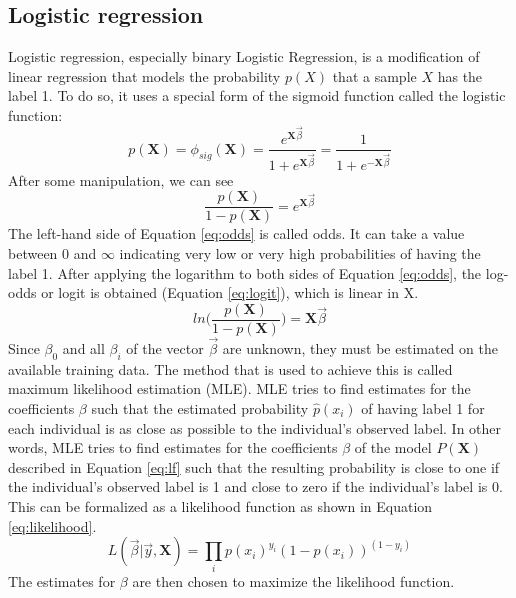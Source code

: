 \subsection{Logistic regression}
Logistic regression, especially binary Logistic Regression, is a modification 
of linear regression that models the probability $p(X)$ that a sample $X$ has 
the label 1. To do so, it uses a special form of the sigmoid function called 
the logistic function:
\begin{equation}
 p(\mathbf{X}) = \phi_{sig}(\mathbf{X}) = 
\frac{e^{\mathbf{X}\vec{\beta}}}{1+e^{\mathbf{X}\vec{\beta}}} = 
\frac{1}{1+e^{-\mathbf{X}\vec{\beta}}}
 \label{eq:lf}
\end{equation}
After some manipulation, we can see
\begin{equation}
 \frac{p(\mathbf{X})}{1-p(\mathbf{X})} = e^{\mathbf{X}\vec{\beta}}
 \label{eq:odds}
\end{equation}
The left-hand side of Equation \ref{eq:odds} is called odds. It can take a 
value between 0 and $\infty$ indicating very low or very high probabilities 
of having the label 1.
After applying the logarithm to both sides of Equation \ref{eq:odds}, the 
log-odds or logit is obtained (Equation \ref{eq:logit}), which is linear in X.
\begin{equation}
 ln \Big( \frac{p(\mathbf{X})}{1-p(\mathbf{X})} \Big) = \mathbf{X}\vec{\beta}
 \label{eq:logit}
\end{equation}
Since $\beta_0$ and all $\beta_i$ of the vector $\vec{\beta}$ are unknown, 
they must be estimated on the 
available training data. The method that is used to achieve this is called 
maximum likelihood estimation (MLE). MLE tries to find estimates for the 
coefficients $\beta$ such that the estimated probability $\hat{p}(x_i)$ of 
having label 1 for each individual is as close as possible to the individual's 
observed label. In other words, MLE tries to find estimates for the 
coefficients $\beta$ of the model $P(\mathbf{X})$ described in Equation 
\ref{eq:lf} such that the resulting probability is close to one if the 
individual's observed label is 1 and close to zero if the individual's label is 
0. This can be formalized as a likelihood function as shown in Equation 
\ref{eq:likelihood}.
\begin{equation}
 L(\vec{\beta}|\vec{y}, \mathbf{X}) = \prod_{i} p(x_i)^{y_i} 
(1-p(x_i))^{(1-y_i)}
\label{eq:likelihood}
\end{equation}
The estimates for $\beta$ are then chosen to maximize the likelihood 
function.\cite{RN166}
